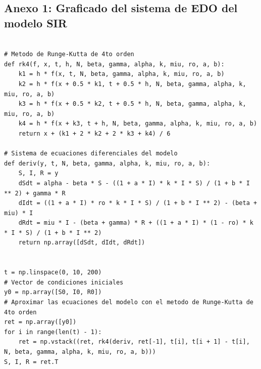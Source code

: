 \documentclass{article}
\begin{document}
\subsection*{Anexo 1: Graficado del sistema de EDO del modelo SIR}

\begin{lstlisting}[label={lst:runge_kutta}]

# Metodo de Runge-Kutta de 4to orden
def rk4(f, x, t, h, N, beta, gamma, alpha, k, miu, ro, a, b):
    k1 = h * f(x, t, N, beta, gamma, alpha, k, miu, ro, a, b)
    k2 = h * f(x + 0.5 * k1, t + 0.5 * h, N, beta, gamma, alpha, k, miu, ro, a, b)
    k3 = h * f(x + 0.5 * k2, t + 0.5 * h, N, beta, gamma, alpha, k, miu, ro, a, b)
    k4 = h * f(x + k3, t + h, N, beta, gamma, alpha, k, miu, ro, a, b)
    return x + (k1 + 2 * k2 + 2 * k3 + k4) / 6

# Sistema de ecuaciones diferenciales del modelo
def deriv(y, t, N, beta, gamma, alpha, k, miu, ro, a, b):
    S, I, R = y
    dSdt = alpha - beta * S - ((1 + a * I) * k * I * S) / (1 + b * I ** 2) + gamma * R
    dIdt = ((1 + a * I) * ro * k * I * S) / (1 + b * I ** 2) - (beta + miu) * I
    dRdt = miu * I - (beta + gamma) * R + ((1 + a * I) * (1 - ro) * k * I * S) / (1 + b * I ** 2)
    return np.array([dSdt, dIdt, dRdt])


t = np.linspace(0, 10, 200)    
# Vector de condiciones iniciales
y0 = np.array([S0, I0, R0])
# Aproximar las ecuaciones del modelo con el metodo de Runge-Kutta de 4to orden
ret = np.array([y0])
for i in range(len(t) - 1):
    ret = np.vstack((ret, rk4(deriv, ret[-1], t[i], t[i + 1] - t[i], N, beta, gamma, alpha, k, miu, ro, a, b)))
S, I, R = ret.T

\end{lstlisting}
\end{document}
